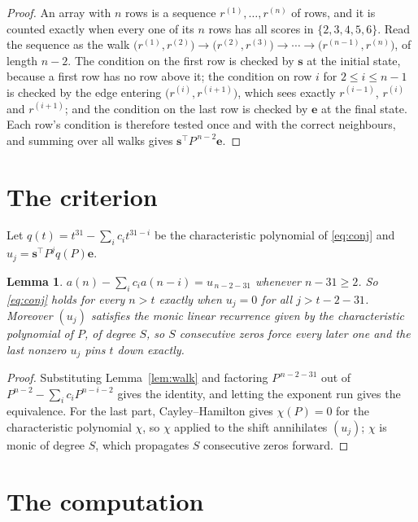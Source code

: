 \documentclass[11pt,a4paper]{article}
\theoremstyle{plain}
\newtheorem{lemma}[theorem]{Lemma}
\theoremstyle{definition}
\begin{document}
\begin{proof}
An array with $n$ rows is a sequence $r^{(1)},\dots,r^{(n)}$ of rows, and it is counted
exactly when every one of its $n$ rows has all scores in $\{2,3,4,5,6\}$. Read the sequence as the
walk $\bigl(r^{(1)},r^{(2)}\bigr)\to\bigl(r^{(2)},r^{(3)}\bigr)\to\cdots\to
\bigl(r^{(n-1)},r^{(n)}\bigr)$, of length $n-2$. The condition on the first row is
checked by $\mathbf{s}$ at the initial state, because a first row has no row above it; the
condition on row $i$ for $2\le i\le n-1$ is checked by the edge entering
$\bigl(r^{(i)},r^{(i+1)}\bigr)$, which sees exactly $r^{(i-1)}$, $r^{(i)}$ and
$r^{(i+1)}$; and the condition on the last row is checked by $\mathbf{e}$ at the final
state. Each row's condition is therefore tested once and with the correct neighbours, and
summing over all walks gives $\mathbf{s}^{\!\top}P^{\,n-2}\mathbf{e}$.
\end{proof}

\section{The criterion}

Let $q(t)=t^{31}-\sum_i c_i t^{31-i}$ be the characteristic polynomial of
\eqref{eq:conj} and $u_j=\mathbf{s}^{\!\top}P^{j}q(P)\mathbf{e}$.

\begin{lemma}\label{lem:crit}
$a(n)-\sum_i c_i a(n-i)=u_{\,n-2-31}$ whenever $n-31\ge2$. So \eqref{eq:conj}
holds for every $n>t$ exactly when $u_j=0$ for all $j>t-2-31$. Moreover $(u_j)$
satisfies the monic linear recurrence given by the characteristic polynomial of $P$, of
degree $S$, so $S$ consecutive zeros force every later one and the last nonzero $u_j$ pins
$t$ down exactly.
\end{lemma}

\begin{proof}
Substituting Lemma~\ref{lem:walk} and factoring $P^{\,n-2-31}$ out of
$P^{n-2}-\sum_i c_i P^{n-i-2}$ gives the identity, and letting the exponent run gives the
equivalence. For the last part, Cayley--Hamilton gives $\chi(P)=0$ for the characteristic
polynomial $\chi$, so $\chi$ applied to the shift annihilates $(u_j)$; $\chi$ is monic of
degree $S$, which propagates $S$ consecutive zeros forward.
\end{proof}

\section{The computation}
\end{document}
